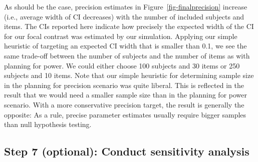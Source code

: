 \documentclass[
  man,
  floatsintext,
  longtable,
  a4paper,
  nolmodern,
  notxfonts,
  notimes,
  colorlinks=true,linkcolor=blue,citecolor=blue,urlcolor=blue]{apa7}
\begin{document}
As should be the case, precision estimates in
Figure~\ref{fig-finalprecision} increase (i.e., average width of CI
decreases) with the number of included subjects and items. The CIs
reported here indicate how precisely the expected width of the CI for
our focal contrast was estimated by our simulation. Applying our simple
heuristic of targeting an expected CI width that is smaller than 0.1, we
see the same trade-off between the number of subjects and the number of
items as with planning for power. We could either choose 100 subjects
and 30 items or 250 subjects and 10 items. Note that our simple
heuristic for determining sample size in the planning for precision
scenario was quite liberal. This is reflected in the result that we
would need a smaller sample size than in the planning for power
scenario. With a more conservative precision target, the result is
generally the opposite: As a rule, precise parameter estimates usually
require bigger samples than null hypothesis testing.

\subsection{Step 7 (optional): Conduct sensitivity
analysis}\label{step-7-optional-conduct-sensitivity-analysis}
\end{document}
